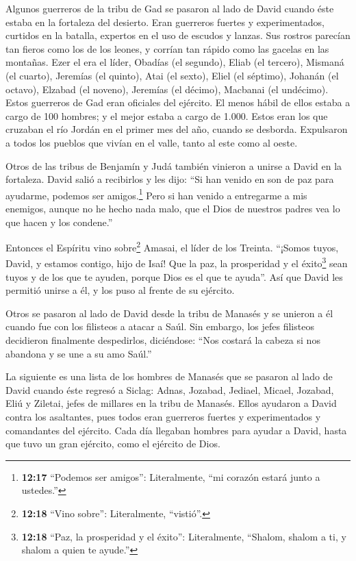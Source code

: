  Algunos guerreros de la tribu de Gad se pasaron al lado de
David cuando éste estaba en la fortaleza del desierto. Eran guerreros
fuertes y experimentados, curtidos en la batalla, expertos en el uso de
escudos y lanzas. Sus rostros parecían tan fieros como los de los
leones, y corrían tan rápido como las gacelas en las montañas.
 Ezer el era el líder, Obadías (el segundo), Eliab (el
tercero),  Mismaná (el cuarto), Jeremías (el quinto),
 Atai (el sexto), Eliel (el séptimo),  Johanán
(el octavo), Elzabad (el noveno),  Jeremías (el décimo),
Macbanai (el undécimo).  Estos guerreros de Gad eran
oficiales del ejército. El menos hábil de ellos estaba a cargo de 100
hombres; y el mejor estaba a cargo de 1.000.  Estos eran
los que cruzaban el río Jordán en el primer mes del año, cuando se
desborda. Expulsaron a todos los pueblos que vivían en el valle, tanto
al este como al oeste.

 Otros de las tribus de Benjamín y Judá también vinieron a
unirse a David en la fortaleza.  David salió a recibirlos y
les dijo: ``Si han venido en son de paz para ayudarme, podemos ser
amigos.\footnote{\textbf{12:17} ``Podemos ser amigos'': Literalmente,
  ``mi corazón estará junto a ustedes.''} Pero si han venido a
entregarme a mis enemigos, aunque no he hecho nada malo, que el Dios de
nuestros padres vea lo que hacen y los condene.''

 Entonces el Espíritu vino sobre\footnote{\textbf{12:18}
  ``Vino sobre'': Literalmente, ``vistió''.} Amasai, el líder de los
Treinta. ``¡Somos tuyos, David, y estamos contigo, hijo de Isaí! Que la
paz, la prosperidad y el éxito\footnote{\textbf{12:18} ``Paz, la
  prosperidad y el éxito'': Literalmente, ``Shalom, shalom a ti, y
  shalom a quien te ayude.''} sean tuyos y de los que te ayuden, porque
Dios es el que te ayuda''. Así que David les permitió unirse a él, y los
puso al frente de su ejército.

 Otros se pasaron al lado de David desde la tribu de
Manasés y se unieron a él cuando fue con los filisteos a atacar a Saúl.
Sin embargo, los jefes filisteos decidieron finalmente despedirlos,
diciéndose: ``Nos costará la cabeza si nos abandona y se une a su amo
Saúl.''

 La siguiente es una lista de los hombres de Manasés que se
pasaron al lado de David cuando éste regresó a Siclag: Adnas, Jozabad,
Jediael, Micael, Jozabad, Eliú y Ziletai, jefes de millares en la tribu
de Manasés.  Ellos ayudaron a David contra los asaltantes,
pues todos eran guerreros fuertes y experimentados y comandantes del
ejército.  Cada día llegaban hombres para ayudar a David,
hasta que tuvo un gran ejército, como el ejército de Dios.


